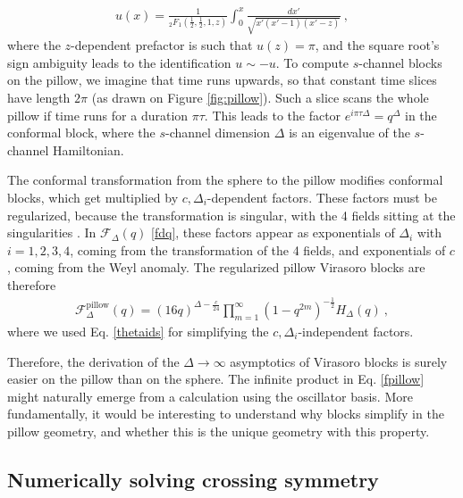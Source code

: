 \documentclass[12pt, a4paper]{article}
\theoremstyle{break}
\begin{document}
\begin{align}
 u(x) = \frac{1}{{}_2F_1\left(\tfrac12,\tfrac12,1,z\right)} \int_0^x \frac{dx'}{\sqrt{x'(x'-1)(x'-z)}} \ ,
\end{align}
where the $z$-dependent prefactor is such that $u(z)=\pi$, and the square root's sign ambiguity leads to the identification $u\sim -u$. To compute $s$-channel blocks on the pillow, we imagine that time runs upwards, so that constant time slices have length $2\pi$ (as drawn on Figure \eqref{fig:pillow}). Such a slice scans the whole pillow if time runs for a duration $\pi\tau$. This leads to the factor $e^{i\pi\tau\Delta}=q^\Delta$ in the conformal block, where the $s$-channel dimension $\Delta$ is an eigenvalue of the $s$-channel Hamiltonian. 

The conformal transformation from the sphere to the pillow modifies conformal blocks, which get multiplied by $c,\Delta_i$-dependent factors. These factors must be regularized, because the transformation is singular, with the 4 fields sitting at the singularities \cite[Appendix D]{msz15}. In $\mathcal{F}_\Delta(q)$ \eqref{fdq}, these factors appear as exponentials of $\Delta_i$ with $i=1,2,3,4$, coming from the transformation of the 4 fields, and exponentials of $c$, coming from the Weyl anomaly. The regularized pillow Virasoro blocks are therefore 
\begin{align}
 \mathcal{F}_\Delta^\text{pillow}(q) = (16q)^{\Delta-\frac{c}{24}} \prod_{m=1}^\infty \left(1-q^{2m}\right)^{-\frac12} H_\Delta(q)\ , 
 \label{fpillow} 
\end{align}
where we used Eq. \eqref{thetaids} for simplifying the $c,\Delta_i$-independent factors. 

Therefore, the derivation of the $\Delta\to\infty$ asymptotics of Virasoro blocks is surely easier on the pillow than on the sphere. The infinite product in Eq. \eqref{fpillow} might naturally emerge from a calculation using the oscillator basis. More fundamentally, it would be interesting to understand why blocks simplify in the pillow geometry, and whether this is the unique geometry with this property. 

\subsection{Numerically solving crossing symmetry}
\end{document}
